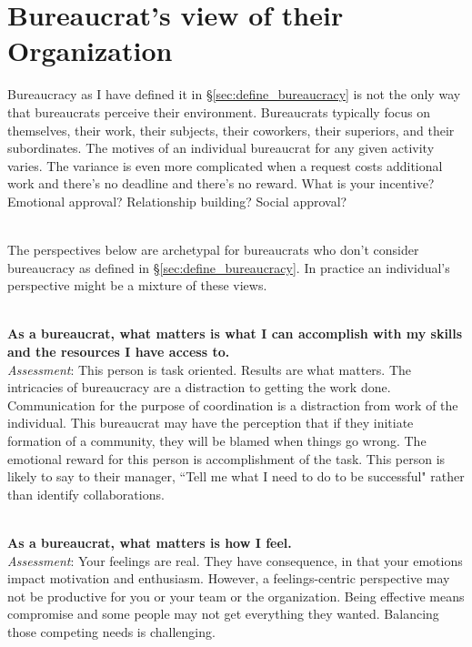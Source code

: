 \section{Bureaucrat's view of their Organization\label{sec:alternative_views_from_within}}

Bureaucracy as I have defined it in \S\ref{sec:define_bureaucracy} is not the only way that bureaucrats perceive their environment. Bureaucrats typically focus on themselves, their work, their subjects, their coworkers, their superiors, and their subordinates. The motives of an individual bureaucrat for any given activity varies. The variance is even more complicated when a request costs additional work and there's no deadline and there's no reward. What is your incentive? Emotional approval? Relationship building? Social approval?

\ \\

The perspectives below are archetypal for bureaucrats who don't consider bureaucracy as defined in \S\ref{sec:define_bureaucracy}. In practice an individual's perspective might be a mixture of these views.

\ \\
\textbf{As a bureaucrat, what matters is what I can accomplish with my skills and the resources I have access to.} \\
\textit{Assessment}: This person is task oriented. Results are what matters. The intricacies of bureaucracy are a distraction to getting the work done. 
Communication  for the purpose of coordination is a distraction from work of the individual. 
This bureaucrat may have the perception that if they initiate formation of a community, they will be blamed when things go wrong.
The emotional reward for this person is accomplishment of the task. This person is likely to say to their manager, ``Tell me what I need to do to be successful" rather than identify collaborations.

\ \\
\textbf{As a bureaucrat, what matters is how I feel.} \\
\textit{Assessment}: Your feelings are real. They have consequence, in that your emotions impact motivation and enthusiasm. However, a feelings-centric perspective may not be productive for you or your team or the organization. Being effective means compromise and some people may not get everything they wanted. Balancing those competing needs is challenging.

